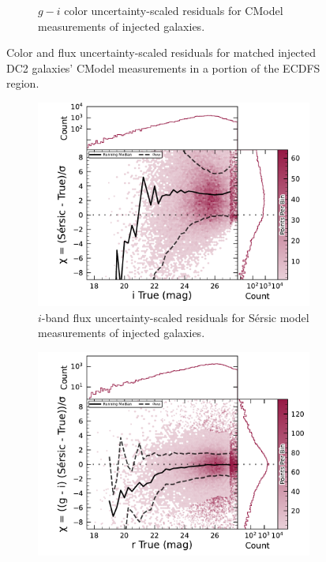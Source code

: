 \begin{figure}[hbt!]
\begin{subfigure}[t]{0.45\textwidth}
  \caption{$g-i$ color uncertainty-scaled residuals for CModel measurements of injected galaxies.}
  \end{subfigure}\hfill
\caption{Color and flux uncertainty-scaled residuals for matched injected DC2 galaxies' CModel measurements in a portion of the \gls{ECDFS} region.}
\label{fig:injected_lsst_cells_v1_5063_galaxy_cmodel_chi}
\end{figure}

\begin{figure}[hbt!]
  \centering
  \begin{subfigure}[t]{0.45\textwidth}
  \includegraphics[width=\linewidth]{injected_lsst_cells_v1_5063_i_mag_chi_sersic}
  \caption{$i$-band flux uncertainty-scaled residuals for S\'ersic model measurements of injected galaxies.}
  \end{subfigure}\hfill
  \begin{subfigure}[t]{0.45\textwidth}
  \includegraphics[width=\linewidth]{injected_lsst_cells_v1_5063_r_color_chi_sersic_g_minus_i}

\end{subfigure}
\end{figure}
